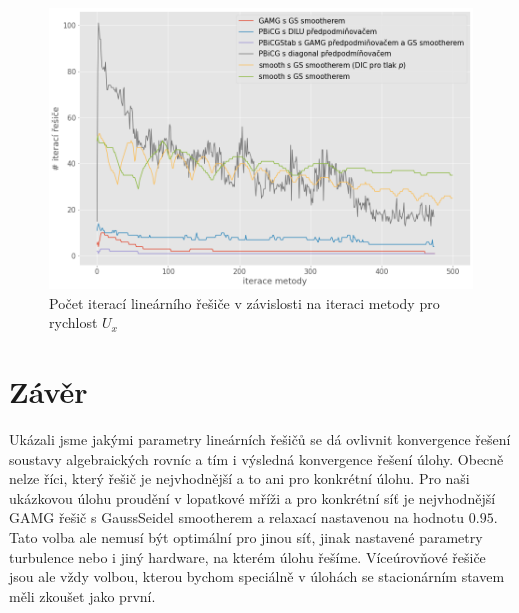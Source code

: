 \documentclass[a4paper,12pt]{report}
\theoremstyle{remark}
\begin{document}
\begin{figure}[H]
	\centering
	\includegraphics[width=1\linewidth]{ux-solver-iters.png}
	\caption{Počet iterací lineárního řešiče v závislosti na iteraci metody pro rychlost $U_x$}
	\label{fig:ux-iters}
\end{figure}

{\let\clearpage\relax \chapter{Závěr}}

Ukázali jsme jakými parametry lineárních řešičů se dá ovlivnit konvergence řešení soustavy algebraických rovníc a tím i výsledná konvergence řešení úlohy. Obecně nelze říci, který řešič je nejvhodnější a to ani pro konkrétní úlohu. Pro naši ukázkovou úlohu proudění v lopatkové mříži a pro konkrétní síť je nejvhodnější GAMG řešič s GaussSeidel smootherem a relaxací nastavenou na hodnotu $0.95$. Tato volba ale nemusí být optimální pro jinou síť, jinak nastavené parametry turbulence nebo i jiný hardware, na kterém úlohu řešíme. Víceúrovňové řešiče jsou ale vždy volbou, kterou bychom speciálně v úlohách se stacionárním stavem měli zkoušet jako první.



\newpage
\appendix
\end{document}
